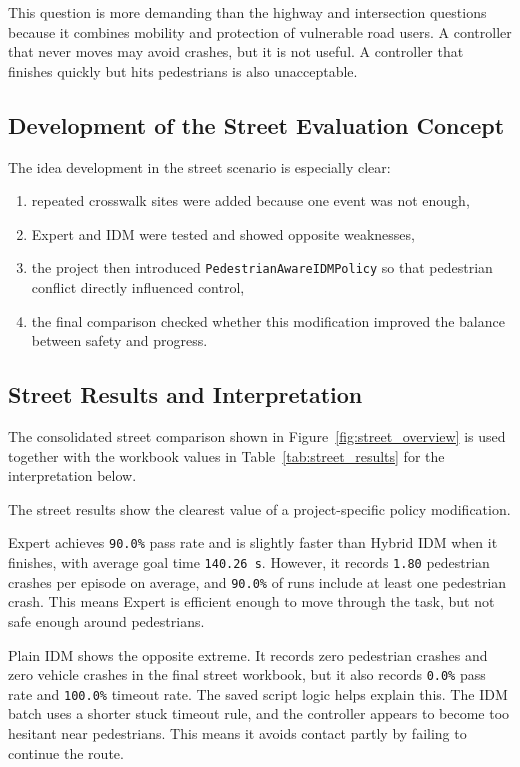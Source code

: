 \documentclass[12pt,a4paper]{report}
\begin{document}
This question is more demanding than the highway and intersection questions because it combines mobility and protection of vulnerable road users. A controller that never moves may avoid crashes, but it is not useful. A controller that finishes quickly but hits pedestrians is also unacceptable.

\subsection{Development of the Street Evaluation Concept}
The idea development in the street scenario is especially clear:

\begin{enumerate}[label=\arabic*.]
    \item repeated crosswalk sites were added because one event was not enough,
    \item Expert and IDM were tested and showed opposite weaknesses,
    \item the project then introduced \texttt{PedestrianAwareIDMPolicy} so that pedestrian conflict directly influenced control,
    \item the final comparison checked whether this modification improved the balance between safety and progress.
\end{enumerate}

\subsection{Street Results and Interpretation}
The consolidated street comparison shown in Figure~\ref{fig:street_overview} is used together with the workbook values in Table~\ref{tab:street_results} for the interpretation below.

The street results show the clearest value of a project-specific policy modification.

Expert achieves \texttt{90.0\%} pass rate and is slightly faster than Hybrid IDM when it finishes, with average goal time \texttt{140.26 s}. However, it records \texttt{1.80} pedestrian crashes per episode on average, and \texttt{90.0\%} of runs include at least one pedestrian crash. This means Expert is efficient enough to move through the task, but not safe enough around pedestrians.

Plain IDM shows the opposite extreme. It records zero pedestrian crashes and zero vehicle crashes in the final street workbook, but it also records \texttt{0.0\%} pass rate and \texttt{100.0\%} timeout rate. The saved script logic helps explain this. The IDM batch uses a shorter stuck timeout rule, and the controller appears to become too hesitant near pedestrians. This means it avoids contact partly by failing to continue the route.
\end{document}
